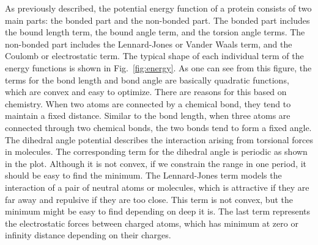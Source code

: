 \documentclass{article} %
\begin{document}
As previously described, the potential energy function of a protein consists of two main parts: the bonded part and the non-bonded part.
The bonded part includes the bound length term, the bound angle term, and the torsion angle terms. The non-bonded part includes the 
Lennard-Jones or Vander Waals term, and the Coulomb or electrostatic term. The typical shape of each individual term of the energy functions
is shown in Fig.~\ref{fig:energy}. As one can see from this figure, the terms for the bond length and bond angle are basically quadratic functions,
which are convex and easy to optimize. There are  reasons for this based on chemistry. When two atoms are connected by a chemical bond, they 
tend to maintain a fixed distance. Similar to the bond length, when three atoms are connected through two chemical bonds, the two bonds
tend to form a fixed angle.  The dihedral angle potential describes the interaction arising from torsional forces in molecules.
The corresponding term for the dihedral angle is periodic as shown in the plot. Although it is not convex, if we constrain the range in one
period, it should be easy to find the minimum. The Lennard-Jones term models the interaction of a pair of neutral atoms or molecules, which is 
attractive if they are far away and repulsive if they are too close. This term is not convex, but the minimum might be easy to find depending 
on deep it is.  The last term represents the electrostatic forces between charged atoms, which has minimum at zero or infinity distance 
depending on their charges. 
\end{document}
